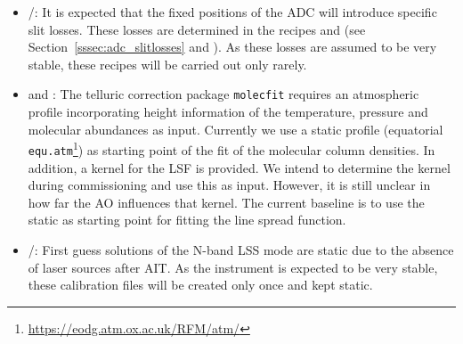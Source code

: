 \begin{itemize}
    \item \hyperref[dataitem:lm_adc_slitloss]{}/\hyperref[dataitem:n_adc_slitloss]{}: It is expected that the fixed positions of the \ac{ADC} will introduce specific slit losses. These losses are determined in the recipes \hyperref[rec:metislmadcmslitloss]{} and \hyperref[rec:metisnadcmslitloss]{} (see Section~\ref{sssec:adc_slitlosses} and \cite{METIS-calibration_plan}). As these losses are assumed to be very stable, these recipes will be carried out only rarely.
    \item \hyperref[dataitem:atm_profile]{} and \hyperref[dataitem:lsf_kernel]{}: The telluric correction package \texttt{molecfit} requires an atmospheric profile incorporating height information of the temperature, pressure and molecular abundances as input. Currently we use a static profile (equatorial \texttt{equ.atm}\footnote{\url{https://eodg.atm.ox.ac.uk/RFM/atm/}}) as starting point of the fit of the molecular column densities. In addition, a kernel for the \ac{LSF} is provided. We intend to determine the kernel during commissioning and use this as input. However, it is still unclear in how far the \ac{AO} influences that kernel. The current baseline is to use the static \hyperref[dataitem:lsf_kernel]{} as starting point for fitting the line spread function.
    \item \hyperref[dataitem:n_lss_dist_sol]{}/\hyperref[dataitem:n_lss_wave_guess]{}: First guess solutions of the N-band LSS mode are static due to the absence of laser sources after \ac{AIT}. As the instrument is expected to be very stable, these calibration files will be created only once and kept static.
\end{itemize}
